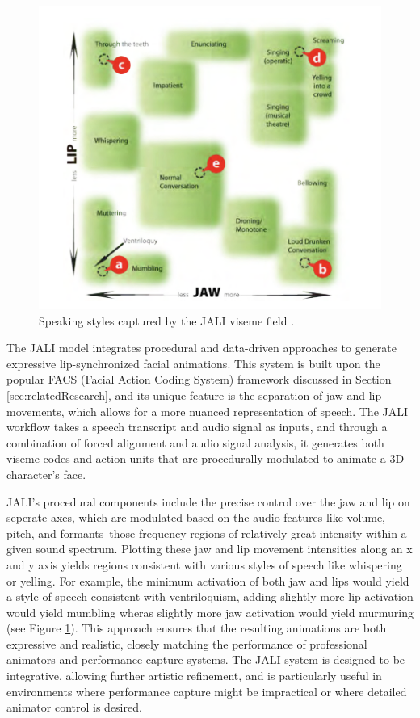 \documentclass[12pt]{article}
\begin{document}
\begin{figure}
\centering
\includegraphics[width=\linewidth]{jali.png}
\caption{Speaking styles captured by the JALI viseme field \cite{Edwards2016}.}
\label{fig:jali-viseme-field}
\end{figure}

The JALI  model integrates procedural and data-driven approaches to generate expressive lip-synchronized facial animations. This system is built upon the popular FACS (Facial Action Coding System) framework \cite{ekman1978facs} discussed in Section \ref{sec:relatedResearch}, and its unique feature is the separation of jaw and lip movements, which allows for a more nuanced representation of speech. The JALI workflow takes a speech transcript and audio signal as inputs, and through a combination of forced alignment and audio signal analysis, it generates both viseme codes and action units that are procedurally modulated to animate a 3D character's face.

JALI’s procedural components include the precise control over the jaw and lip on seperate axes, which are modulated based on the audio features like volume, pitch, and formants--those frequency regions of relatively great intensity within a given sound spectrum. Plotting these jaw and lip movement intensities along an x and y axis yields regions consistent with various styles of speech like whispering or yelling. For example, the minimum activation of both jaw and lips would yield a style of speech consistent with ventriloquism, adding slightly more lip activation would yield mumbling wheras slightly more jaw activation would yield murmuring (see Figure \ref{fig:jali-viseme-field}). This approach ensures that the resulting animations are both expressive and realistic, closely matching the performance of professional animators and performance capture systems. The JALI system is designed to be integrative, allowing further artistic refinement, and is particularly useful in environments where performance capture might be impractical or where detailed animator control is desired.
\end{document}
